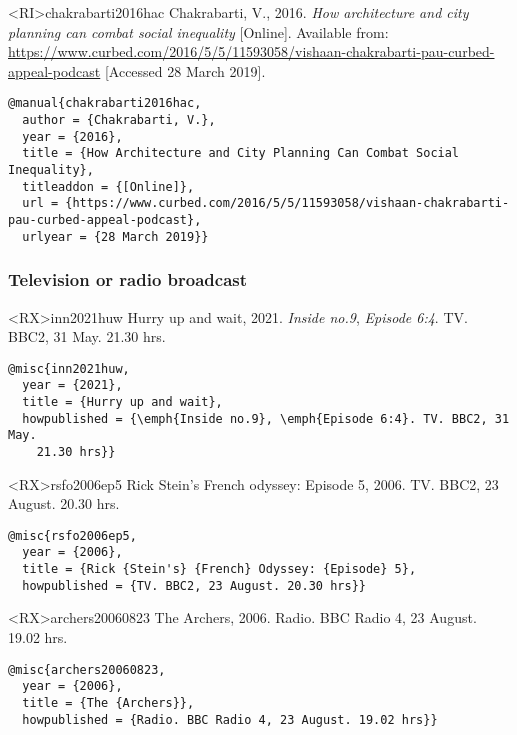 \documentclass[10pt,a4paper]{article}
\begin{document}
\begin{bibexbox}<RI>{chakrabarti2016hac}
   Chakrabarti, V., 2016. \emph{How architecture and city planning can combat social inequality} [Online]. Available from: \url{https://www.curbed.com/2016/5/5/11593058/vishaan-chakrabarti-pau-curbed-appeal-podcast} [Accessed 28 March 2019].
  \tcblower
\begin{Verbatim}
@manual{chakrabarti2016hac,
  author = {Chakrabarti, V.},
  year = {2016},
  title = {How Architecture and City Planning Can Combat Social Inequality},
  titleaddon = {[Online]},
  url = {https://www.curbed.com/2016/5/5/11593058/vishaan-chakrabarti-pau-curbed-appeal-podcast},
  urlyear = {28 March 2019}}
\end{Verbatim}
\end{bibexbox}

\subsubsection*{Television or radio broadcast}


\begin{bibexbox}<RX>{inn2021huw}
  Hurry up and wait, 2021. \emph{Inside no.9}, \emph{Episode 6:4}. TV. BBC2, 31 May. 21.30 hrs.
  \tcblower
\begin{Verbatim}
@misc{inn2021huw,
  year = {2021},
  title = {Hurry up and wait},
  howpublished = {\emph{Inside no.9}, \emph{Episode 6:4}. TV. BBC2, 31 May.
    21.30 hrs}}
\end{Verbatim}
\end{bibexbox}

\begin{bibexbox}<RX>{rsfo2006ep5}
  Rick Stein's French odyssey: Episode 5, 2006. TV. BBC2, 23 August. 20.30 hrs.
  \tcblower
\begin{Verbatim}
@misc{rsfo2006ep5,
  year = {2006},
  title = {Rick {Stein's} {French} Odyssey: {Episode} 5},
  howpublished = {TV. BBC2, 23 August. 20.30 hrs}}
\end{Verbatim}
\end{bibexbox}

\begin{bibexbox}<RX>{archers20060823}
  The Archers, 2006. Radio. BBC Radio 4, 23 August. 19.02 hrs.
  \tcblower
\begin{Verbatim}
@misc{archers20060823,
  year = {2006},
  title = {The {Archers}},
  howpublished = {Radio. BBC Radio 4, 23 August. 19.02 hrs}}
\end{Verbatim}
\end{bibexbox}
\end{document}
